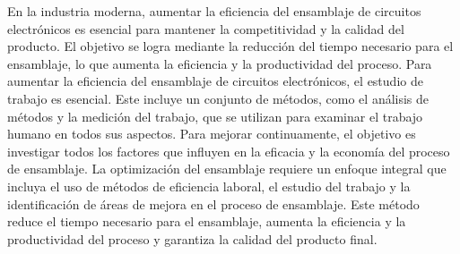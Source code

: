 % 
% 
% 
En la industria moderna, aumentar la eficiencia del ensamblaje de circuitos electrónicos es esencial para mantener la competitividad y la calidad del producto. El objetivo se logra mediante la reducción del tiempo necesario para el ensamblaje, lo que aumenta la eficiencia y la productividad del proceso.
    Para aumentar la eficiencia del ensamblaje de circuitos electrónicos, el estudio de trabajo es esencial. Este incluye un conjunto de métodos, como el análisis de métodos y la medición del trabajo, que se utilizan para examinar el trabajo humano en todos sus aspectos. Para mejorar continuamente, el objetivo es investigar todos los factores que influyen en la eficacia y la economía del proceso de ensamblaje.\cite{estudio_del_trabajo}
    La optimización del ensamblaje requiere un enfoque integral que incluya el uso de métodos de eficiencia laboral, el estudio del trabajo y la identificación de áreas de mejora en el proceso de ensamblaje. Este método reduce el tiempo necesario para el ensamblaje, aumenta la eficiencia y la productividad del proceso y garantiza la calidad del producto final.
    \cite{freivalds2014ingenieria}
% 
% 

